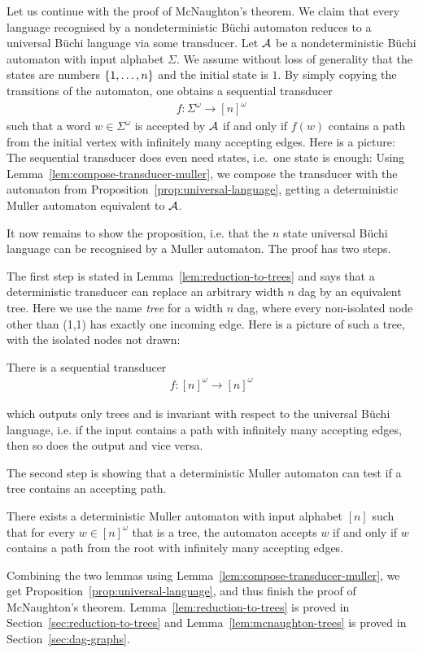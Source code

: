 Let us continue with the proof of McNaughton's theorem. We claim that every language recognised by a nondeterministic Büchi automaton reduces to a universal Büchi language via some transducer. Let $\mathcal{A}$ be a nondeterministic Büchi automaton with input alphabet $\Sigma$. We assume without loss of generality that the states are numbers $\{1,\ldots,n\}$ and the initial state is $1$. By simply copying the transitions of the automaton, one obtains a sequential transducer
\begin{align*}
f : \Sigma^\omega \to [n]^\omega
\end{align*}
such that a word $w \in \Sigma^\omega$ is accepted by $\mathcal{A}$ if and only if $f(w)$ contains a path from the initial vertex with infinitely many accepting edges. Here is a picture:
The sequential transducer does even need states, i.e.~one state is enough: 
Using Lemma~\ref{lem:compose-transducer-muller}, we compose the transducer with the automaton from Proposition~\ref{prop:universal-language}, getting a deterministic Muller automaton equivalent to $\mathcal{A}$.
 
  It now remains to show the proposition, i.e. that the $n$ state universal Büchi language can be recognised by a Muller automaton. The proof has two steps. 

The first step is stated in Lemma~\ref{lem:reduction-to-trees} and says that a deterministic transducer can  replace an arbitrary width $n$  dag by an equivalent tree. Here we use the name \emph{tree} for a width $n$ dag, where every non-isolated node other than (1,1) has exactly one incoming edge. Here is a picture of such a tree, with the isolated nodes not drawn:

\begin{lemma}\label{lem:reduction-to-trees}
There is a sequential transducer
\begin{align*}
f : [n]^\omega \to [n]^\omega
\end{align*}

which outputs only trees and is invariant with respect to the universal Büchi language, i.e. if the input contains a path with infinitely many accepting edges, then so does the output and vice versa.
	\end{lemma}

The second step is showing that  a deterministic Muller automaton can test if a tree contains an accepting path.

\begin{lemma}\label{lem:mcnaughton-trees}
There exists a deterministic Muller automaton with input alphabet $[n]$ such that for every $w \in [n]^\omega$ that is a tree,  the automaton accepts $w$ if and only if  $w$ contains	 a path from the root with infinitely many accepting edges.
\end{lemma}
Combining the two lemmas using Lemma~\ref{lem:compose-transducer-muller}, we get Proposition~\ref{prop:universal-language}, and thus finish the proof of McNaughton's theorem. Lemma~\ref{lem:reduction-to-trees} is proved in Section~\ref{sec:reduction-to-trees} and Lemma~\ref{lem:mcnaughton-trees} is proved in Section~\ref{sec:dag-graphs}.


